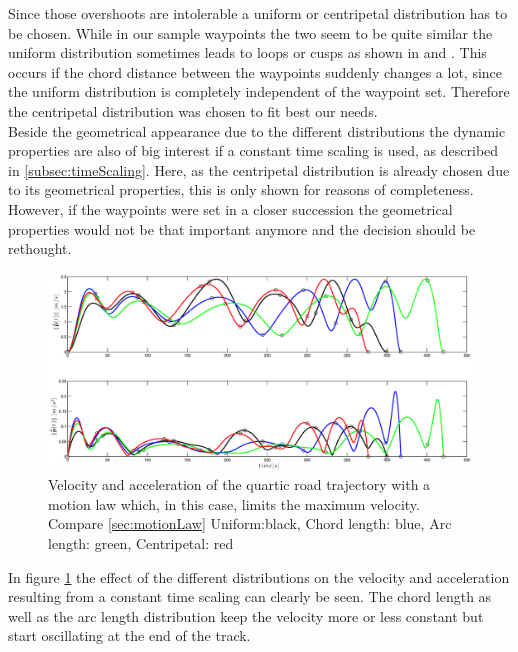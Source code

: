 Since those overshoots are intolerable a uniform or centripetal distribution has to be chosen. While in our sample waypoints the two seem to be quite similar the uniform distribution sometimes leads to  loops or cusps as shown in \cite{lee} and \cite{haron}. This occurs if the chord distance between the waypoints suddenly changes a lot, since the uniform distribution is completely independent of the waypoint set. Therefore the centripetal distribution was chosen to fit best our needs.
\\
Beside the geometrical appearance due to the different distributions the dynamic properties are also of big interest if a constant time scaling is used, as described in \ref{subsec:timeScaling}. Here, as the centripetal distribution is already chosen due to its geometrical properties, this is only shown for reasons of completeness. However, if the waypoints were set in a closer succession the geometrical properties would not be that important anymore and the decision should be rethought.

\begin{figure}[H]
  \begin{minipage}[t]{0.96\textwidth}
    \includegraphics[width = \textwidth]{graphics/Parameterization4_road_vel_acc.eps}
  \end{minipage}
  \caption{Velocity and acceleration of the quartic road trajectory with a motion law which, in this case, limits the maximum velocity. Compare \ref{sec:motionLaw} Uniform:black, Chord length: blue, Arc length: green, Centripetal: red}
  \label{fig:para road vel acc}
\end{figure}

In figure \ref{fig:para road vel acc} the effect of the different distributions on the velocity and acceleration resulting from a constant time scaling can clearly be seen. The chord length as well as the arc length distribution keep the velocity more or less constant but start oscillating at the end of the track.

